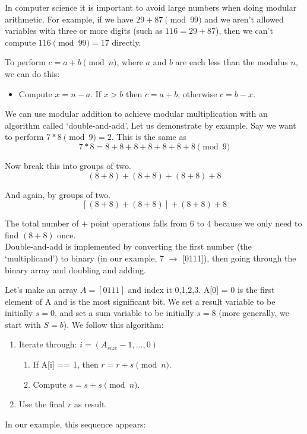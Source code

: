In computer science it is important to avoid large numbers when doing modular arithmetic. For example, if we have $29+87 \pmod{99}$ and we aren't allowed variables with three or more digits (such as $116 = 29+87$), then we can't compute $116 \pmod{99} = 17$ directly.

To perform $c = a+b \pmod n$, where $a$ and $b$ are each less than the modulus $n$, we can do this:
\begin{itemize}
	\item Compute $x = n-a$. If $x > b$ then $c = a+b$, otherwise $c = b - x$.
\end{itemize}

We can use modular addition to achieve modular multiplication with an algorithm called `double-and-add'. Let us demonstrate by example. Say we want to perform $7*8 \pmod 9 = 2$. This is the same as 
\[7*8 = 8+8+8+8+8+8+8 \pmod 9\]

Now break this into groups of two. 
\[(8+8) + (8+8) + (8+8) + 8\]

And again, by groups of two.
\[[(8+8) + (8+8)] + (8+8) + 8\]

The total number of $+$ point operations falls from 6 to 4 because we only need to find $(8+8)$ once.\\

Double-and-add is implemented by converting the first number (the `multiplicand') to binary (in our example, 7 $\rightarrow$ [0111]), then going through the binary array and doubling and adding. 

Let's make an array $A = [0111]$ and index it 0,1,2,3. A[0] = 0 is the first element of A and is the most significant bit. We set a result variable to be initially $s = 0$, and set a sum variable to be initially $s = 8$ (more generally, we start with $S = b$). We follow this algorithm:

\begin{enumerate}
	\item Iterate through: $i = (A_{size} - 1,...,0)$
	\begin{enumerate}
		\item If A[i] == 1, then $r = r + s \pmod n$.
		\item Compute $s = s + s \pmod n$.
	\end{enumerate}
	\item Use the final $r$ as result.
\end{enumerate}

In our example, this sequence appears:

